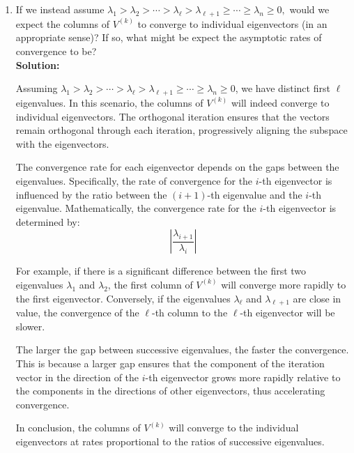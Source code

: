 \documentclass[11pt,onecolumn]{article}
\begin{document}
\begin{enumerate}[label=(\alph*)]
	\item If we instead assume $\lambda_1 > \lambda_2 > \cdots > \lambda_\ell > \lambda_{\ell+1}\geq \cdots \geq \lambda_n \geq 0,$ would we expect the columns of $V^{(k)}$ to converge to individual eigenvectors (in an appropriate sense)? If so, what might be expect the asymptotic rates of convergence to be? \\
	\textbf{Solution:}

	Assuming $\lambda_1 > \lambda_2 > \cdots > \lambda_\ell > \lambda_{\ell+1} \geq \cdots \geq \lambda_n \geq 0$, we have distinct first $\ell$ eigenvalues. In this scenario, the columns of $V^{(k)}$ will indeed converge to individual eigenvectors. The orthogonal iteration ensures that the vectors remain orthogonal through each iteration, progressively aligning the subspace with the eigenvectors.
	
	The convergence rate for each eigenvector depends on the gaps between the eigenvalues. Specifically, the rate of convergence for the $i$-th eigenvector is influenced by the ratio between the $(i+1)$-th eigenvalue and the $i$-th eigenvalue. Mathematically, the convergence rate for the $i$-th eigenvector is determined by:
	\[
	\left| \frac{\lambda_{i+1}}{\lambda_i} \right|
	\]
	
	For example, if there is a significant difference between the first two eigenvalues $\lambda_1$ and $\lambda_2$, the first column of $V^{(k)}$ will converge more rapidly to the first eigenvector. Conversely, if the eigenvalues $\lambda_{\ell}$ and $\lambda_{\ell+1}$ are close in value, the convergence of the $\ell$-th column to the $\ell$-th eigenvector will be slower.
	
	The larger the gap between successive eigenvalues, the faster the convergence. This is because a larger gap ensures that the component of the iteration vector in the direction of the $i$-th eigenvector grows more rapidly relative to the components in the directions of other eigenvectors, thus accelerating convergence.
	
	In conclusion, the columns of $V^{(k)}$ will converge to the individual eigenvectors at rates proportional to the ratios of successive eigenvalues.	

\end{enumerate}
\end{document}

